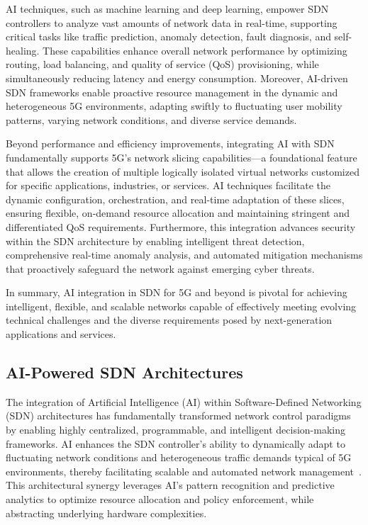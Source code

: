 \documentclass[sigconf]{acmart}
\begin{document}
AI techniques, such as machine learning and deep learning, empower SDN controllers to analyze vast amounts of network data in real-time, supporting critical tasks like traffic prediction, anomaly detection, fault diagnosis, and self-healing. These capabilities enhance overall network performance by optimizing routing, load balancing, and quality of service (QoS) provisioning, while simultaneously reducing latency and energy consumption. Moreover, AI-driven SDN frameworks enable proactive resource management in the dynamic and heterogeneous 5G environments, adapting swiftly to fluctuating user mobility patterns, varying network conditions, and diverse service demands.

Beyond performance and efficiency improvements, integrating AI with SDN fundamentally supports 5G's network slicing capabilities—a foundational feature that allows the creation of multiple logically isolated virtual networks customized for specific applications, industries, or services. AI techniques facilitate the dynamic configuration, orchestration, and real-time adaptation of these slices, ensuring flexible, on-demand resource allocation and maintaining stringent and differentiated QoS requirements. Furthermore, this integration advances security within the SDN architecture by enabling intelligent threat detection, comprehensive real-time anomaly analysis, and automated mitigation mechanisms that proactively safeguard the network against emerging cyber threats.

In summary, AI integration in SDN for 5G and beyond is pivotal for achieving intelligent, flexible, and scalable networks capable of effectively meeting evolving technical challenges and the diverse requirements posed by next-generation applications and services.

\subsection{AI-Powered SDN Architectures}

The integration of Artificial Intelligence (AI) within Software-Defined Networking (SDN) architectures has fundamentally transformed network control paradigms by enabling highly centralized, programmable, and intelligent decision-making frameworks. AI enhances the SDN controller’s ability to dynamically adapt to fluctuating network conditions and heterogeneous traffic demands typical of 5G environments, thereby facilitating scalable and automated network management~\cite{ref52}. This architectural synergy leverages AI’s pattern recognition and predictive analytics to optimize resource allocation and policy enforcement, while abstracting underlying hardware complexities.
\end{document}

